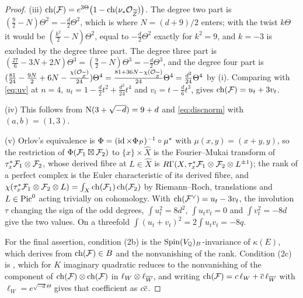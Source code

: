\begin{proof}
(iii) $\operatorname{ch}(\mathcal{F})=e^{3\Theta}\bigl(1-\operatorname{ch}(\nu_{*}\mathcal{O}_{\widetilde Z})\bigr)$. The
degree two part is $(\tfrac92-N)\Theta^{2}=-\tfrac d2\Theta^{2}$, which is
where $N=(d+9)/2$ enters; with the twist $k\Theta$ it would be
$(\tfrac{k^{2}}{2}-N)\Theta^{2}$, equal to $-\tfrac d2\Theta^{2}$ exactly for
$k^{2}=9$, and $k=-3$ is excluded by the degree three part. The degree three
part is $(\tfrac{27}{6}-3N+2N)\Theta^{3}=(\tfrac92-N)\Theta^{3}=-\tfrac d2\Theta^{3}$,
and the degree four part is
$(\tfrac{81}{24}-\tfrac{9N}{2}+6N-\tfrac{\chi(\mathcal{O}_{\widetilde Z})}{24})\Theta^{4}
=\tfrac{81+36N-\chi(\mathcal{O}_{\widetilde Z})}{24}\Theta^{4}=\tfrac{d^{2}}{24}\Theta^{4}$
by (i). Comparing with \eqref{eq:uv} at $n=4$,
$u_{t}=1-\tfrac d2t^{2}+\tfrac{d^{2}}{24}t^{4}$ and $v_{t}=t-\tfrac d6t^{3}$,
gives $\operatorname{ch}(\mathcal{F})=u_{t}+3v_{t}$.

(iv) This follows from $\mathrm{N}(3+\sqrt{-d})=9+d$ and \eqref{eq:discnorm} with
$(a,b)=(1,3)$.

(v) Orlov's equivalence is $\Phi=(\operatorname{id}\times\Phi_{\mathcal{P}})^{-1}\circ\mu^{*}$ with
$\mu(x,y)=(x+y,y)$, so the restriction of $\Phi(\mathcal{F}_{1}\boxtimes\mathcal{F}_{2})$ to
$\{x\}\times\widehat X$ is the Fourier--Mukai transform of
$\tau_{x}^{*}\mathcal{F}_{1}\otimes\mathcal{F}_{2}$, whose derived fibre at $L\in\widehat X$
is $R\Gamma(X,\tau_{x}^{*}\mathcal{F}_{1}\otimes\mathcal{F}_{2}\otimes L^{\pm1})$; the rank
of a perfect complex is the Euler characteristic of its derived fibre, and
$\chi(\tau_{x}^{*}\mathcal{F}_{1}\otimes\mathcal{F}_{2}\otimes L)=\int_{X}\operatorname{ch}(\mathcal{F}_{1})\operatorname{ch}(\mathcal{F}_{2})$
by Riemann--Roch, translations and $L\in\operatorname{Pic}^{0}$ acting trivially on
cohomology. With $\operatorname{ch}(\mathcal{F}^{\vee})=u_{t}-3v_{t}$, the involution $\tau$
changing the sign of the odd degrees, $\int u_{t}^{2}=8d^{2}$,
$\int u_{t}v_{t}=0$ and $\int v_{t}^{2}=-8d$ give the two values. On a
threefold $\int(u_{t}+v_{t})^{2}=2\int u_{t}v_{t}=-8q$.

For the final assertion, condition (2b) is the
$\mathrm{Spin}(V_{\mathbb{Q}})_{B}$-invariance of $\kappa(E)$, which
\cite[Corollary 9.2]{Mar25b} derives from $\operatorname{ch}(\mathcal{F})\in B$ and the
nonvanishing of the rank. Condition (2c) is
\cite[Proposition 10.2]{Mar25b}, which for $K$ imaginary quadratic reduces
to the nonvanishing of the component of $\operatorname{ch}(\mathcal{F})\otimes\operatorname{ch}(\mathcal{F})$ in
$\ell_{W}\otimes\ell_{\overline{W}}$, and writing $\operatorname{ch}(\mathcal{F})=c\,\ell_{W}+\overline{c}\,\ell_{\overline{W}}$
with $\ell_{W}=e^{\sqrt{-d}\Theta}$ gives that coefficient as $c\overline{c}$.
\end{proof}

